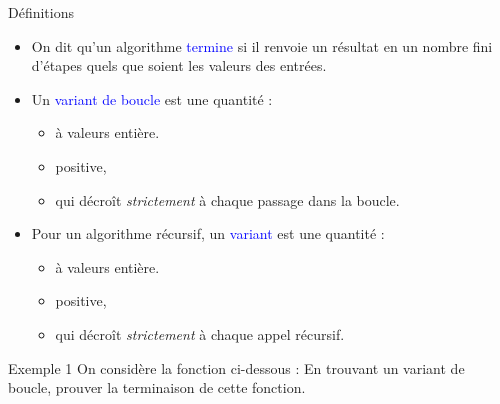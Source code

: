 \documentclass[10pt]{beamer}
\begin{document}
\begin{frame}[fragile]{\Ctitle}{\stitle}
	\begin{block}{\textcolor{gray}{\small \rappel \;} Définitions}
		\begin{itemize}
			\item<2-> On dit qu'un algorithme \textcolor{blue}{termine} si il renvoie un résultat en un nombre fini d'étapes quels que soient les valeurs des entrées.
			\item<3-> Un \textcolor{blue}{variant de boucle} est une quantité :
				\begin{itemize}
					\item<4-> à valeurs entière.
					\item<4-> positive,
					\item<5-> qui décroît \textit{strictement} à chaque passage dans la boucle.
				\end{itemize}
			\item<6-> Pour un algorithme récursif, un \textcolor{blue}{variant} est une quantité :
				\begin{itemize}
					\item<7-> à valeurs entière.
					\item<7-> positive,
					\item<8-> qui décroît \textit{strictement} à chaque appel récursif.
				\end{itemize}
		\end{itemize}
	\end{block}
\end{frame}

\begin{frame}[fragile]{\Ctitle}{\stitle}
	\begin{exampleblock}{Exemple 1}
		On considère la fonction ci-dessous :
		\onslide<2-> En trouvant un variant de boucle, prouver la terminaison de cette fonction.
	\end{exampleblock}
\end{frame}
\end{document}
